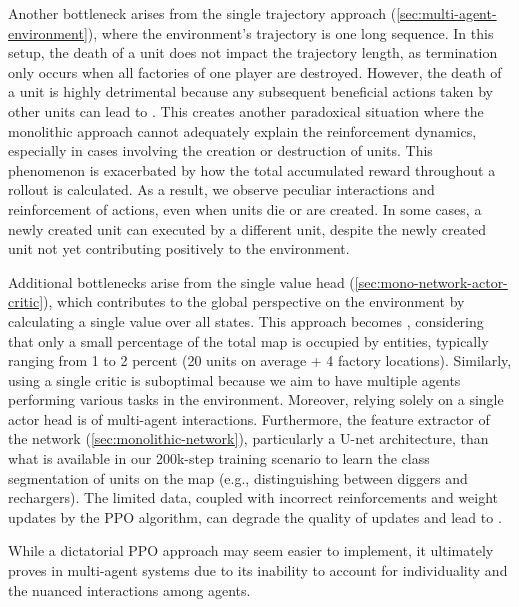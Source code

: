 \noindent Another bottleneck arises from the single trajectory approach (\autoref{sec:multi-agent-environment}), where the environment's trajectory is one long sequence. In this setup, the death of a unit does not impact the trajectory length, as termination only occurs when all factories of one player are destroyed. However, the death of a unit is highly detrimental because any subsequent beneficial actions taken by other units can lead to . This creates another paradoxical situation where the monolithic approach cannot adequately explain the reinforcement dynamics, especially in cases involving the creation or destruction of units. This phenomenon is exacerbated by how the total accumulated reward throughout a rollout is calculated. As a result, we observe peculiar interactions and reinforcement of actions, even when units die or are created. In some cases, a newly created unit can  executed by a different unit, despite the newly created unit not yet contributing positively to the environment.

\bigskip

\noindent Additional bottlenecks arise from the single value head (\autoref{sec:mono-network-actor-critic}), which contributes to the global perspective on the environment by calculating a single value over all states. This approach becomes , considering that only a small percentage of the total map is occupied by entities, typically ranging from 1 to 2 percent (20 units on average + 4 factory locations). Similarly, using a single critic is suboptimal because we aim to have multiple agents performing various tasks in the environment. Moreover, relying solely on a single actor head is  of multi-agent interactions. Furthermore, the feature extractor of the network (\autoref{sec:monolithic-network}), particularly a U-net architecture,  than what is available in our 200k-step training scenario to learn the class segmentation of units on the map (e.g., distinguishing between diggers and rechargers). The limited data, coupled with incorrect reinforcements and weight updates by the PPO algorithm, can degrade the quality of updates and lead to .

\bigskip

\noindent While a dictatorial PPO approach may seem easier to implement, it ultimately proves  in multi-agent systems due to its inability to account for individuality and the nuanced interactions among agents.

